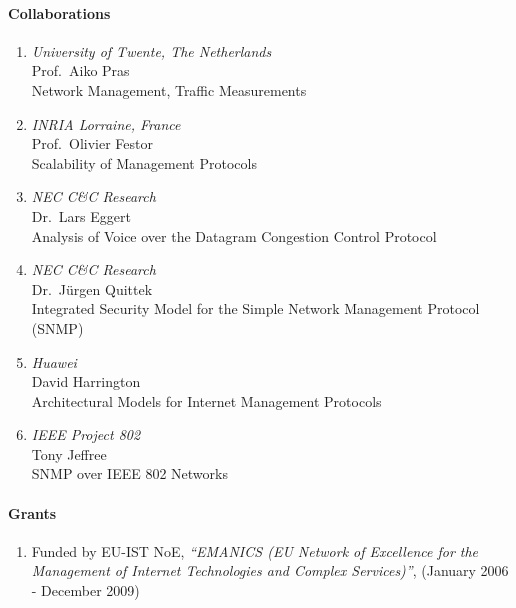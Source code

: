 \paragraph{Collaborations}
\begin{enumerate}
    \item {\sl University of Twente, The Netherlands}\\
          Prof.\ Aiko Pras\\
          Network Management, Traffic Measurements
    \item {\sl INRIA Lorraine, France}\\
          Prof.\ Olivier Festor\\
          Scalability of Management Protocols
    \item {\sl NEC C\&C Research}\\
          Dr.\ Lars Eggert\\
          Analysis of Voice over the Datagram Congestion Control Protocol
    \item {\sl NEC C\&C Research}\\
          Dr.\ J\"urgen Quittek\\
          Integrated Security Model for the Simple Network Management Protocol (SNMP)
    \item {\sl Huawei}\\
          David Harrington\\
          Architectural Models for Internet Management Protocols
    \item {\sl IEEE Project 802}\\
          Tony Jeffree\\
          SNMP over IEEE 802 Networks
\end{enumerate}

\paragraph{Grants}
\begin{enumerate}
    \item Funded by EU-IST NoE,  \emph{ ``EMANICS (EU Network of Excellence for the Management
      of Internet Technologies and Complex Services)''}, (January 2006 - December
      2009)
\end{enumerate}


